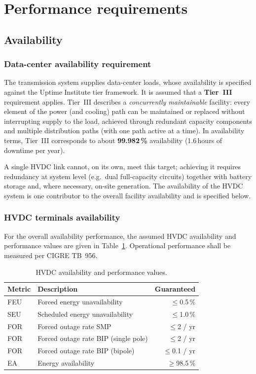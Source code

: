 \section{Performance requirements}

\subsection{Availability}
\label{sec:availability}

\subsubsection{Data-center availability requirement}
The transmission system supplies data-center loads, whose availability is
specified against the Uptime Institute tier framework. It is assumed that a
\textbf{Tier~III} requirement applies. Tier~III describes a
\emph{concurrently maintainable} facility: every element of the power (and
cooling) path can be maintained or replaced without interrupting supply to the
load, achieved through redundant capacity components and multiple distribution
paths (with one path active at a time). In availability terms, Tier~III
corresponds to about \textbf{99.982\,\%} availability (1.6\,hours of downtime per year).

A single HVDC link cannot, on its own, meet this target; achieving it requires
redundancy at system level (e.g.\ dual full-capacity circuits) together with
battery storage and, where necessary, on-site generation. The availability of
the HVDC system is one contributor to the overall facility availability and is
specified below.

\subsubsection{HVDC terminals availability}
For the overall availability performance, the assumed HVDC availability and performance values are given in Table~\ref{tab:availability-guarantees}.
Operational performance shall be measured per CIGRE TB~956.


\begin{table}[htbp]
  \centering
  \renewcommand{\arraystretch}{1.3}
  \begin{tabular}{@{}l l r@{}}
    \toprule
    \textbf{Metric} & \textbf{Description} & \textbf{Guaranteed} \\
    \midrule
    FEU & Forced energy unavailability     & $\le$0.5\,\% \\
    SEU & Scheduled energy unavailability  & $\le$1.0\,\% \\
    FOR & Forced outage rate SMP         & $\le$2 / yr \\
    FOR & Forced outage rate BIP (single pole) & $\le$2 / yr \\
    FOR & Forced outage rate BIP (bipole)      & $\le$0.1 / yr \\
    EA  & Energy availability              & $\ge$98.5\,\% \\
    \bottomrule
  \end{tabular}
  \caption{HVDC availability and performance values.}
  \label{tab:availability-guarantees}
\end{table}


